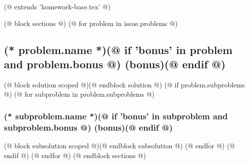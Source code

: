 (@ extends 'homework-base.tex' @)

(@ block sections @)
    (@ for problem in issue.problems @)
        \subsection{(* problem.name *)(@ if 'bonus' in problem and problem.bonus @) (bonus)(@ endif @)}
        \label{sec:(* problem.id *)}
        (@ block solution scoped @)(@ endblock solution @)
        (@ if problem.subproblems @)
            (@ for subproblem in problem.subproblems @)
                \subsubsection{(* subproblem.name *)(@ if 'bonus' in subproblem and subproblem.bonus @) (bonus)(@ endif @)}
                \label{sec:(* problem.id*)-(* subproblem.id *)}
                (@ block subsolution scoped @)(@ endblock subsolution @)
            (@ endfor @)
        (@ endif @)
    (@ endfor @)
(@ endblock sections @)
